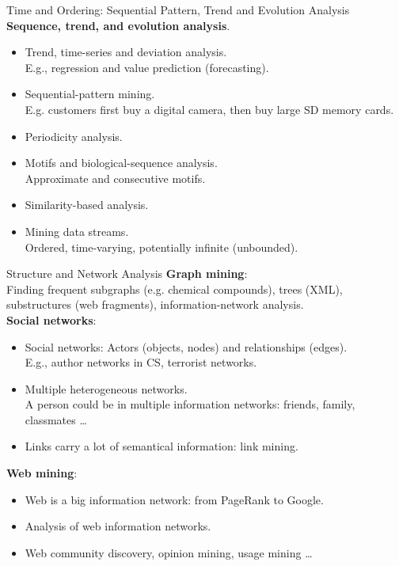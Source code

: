 \begin{frame}{Time and Ordering: Sequential Pattern, Trend and Evolution 
Analysis}
	\textbf{Sequence, trend, and evolution analysis}.\\
	\begin{itemize}
		\item Trend, time-series and deviation analysis. \\
		E.g., regression and value prediction (forecasting).
		\item Sequential-pattern mining.\\
		E.g. customers first buy a digital camera, then buy large SD memory 
		cards.
		\item Periodicity analysis.
		\item Motifs and biological-sequence analysis.\\
		Approximate and consecutive motifs.
		\item Similarity-based analysis.\\
		\item Mining data streams.\\
		Ordered, time-varying, potentially infinite (unbounded).
	\end{itemize}
\end{frame}

\begin{frame}{Structure and Network Analysis}
	\textbf{Graph mining}:\\
	Finding frequent subgraphs (e.g. chemical compounds), trees (XML), 
	substructures (web fragments), information-network analysis.\\[0.2cm]
	
	\textbf{Social networks}:
	\begin{itemize}
		\item Social networks: Actors (objects, nodes) and relationships 
		(edges).\\
		E.g., author networks in CS, terrorist networks.
		\item Multiple heterogeneous networks.\\
		A person could be in multiple information networks: friends, family, 
		classmates \ldots
		\item Links carry a lot of semantical information: link mining.
	\end{itemize}
	
	\textbf{Web mining}:
	\begin{itemize}
		\item Web is a big information network: from PageRank to Google.
		\item Analysis of web information networks.
		\item Web community discovery, opinion mining, usage mining \ldots
	\end{itemize}
\end{frame}

